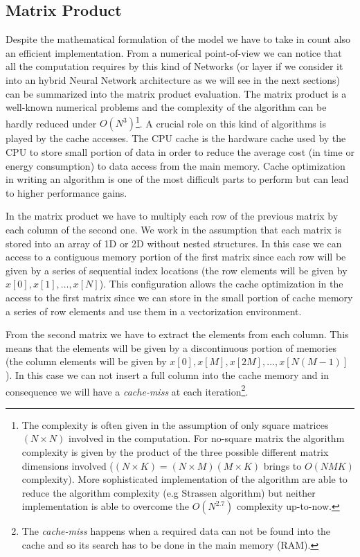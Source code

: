 \documentclass{standalone}
\begin{document}
\subsection[Matrix Product]{Matrix Product}\label{gemm}

Despite the mathematical formulation of the model we have to take in count also an efficient implementation.
From a numerical point-of-view we can notice that all the computation requires by this kind of Networks (or layer if we consider it into an hybrid Neural Network architecture as we will see in the next sections) can be summarized into the matrix product evaluation.
The matrix product is a well-known numerical problems and the complexity of the algorithm can be hardly reduced under $O(N^3)$\footnote{
  The complexity is often given in the assumption of only square matrices $(N\times N)$ involved in the computation.
  For no-square matrix the algorithm complexity is given by the product of the three possible different matrix dimensions involved ($(N\times K) = (N\times M)(M\times K)$ brings to $O(NMK)$ complexity).
  More sophisticated implementation of the algorithm are able to reduce the algorithm complexity (e.g Strassen algorithm) but neither implementation is able to overcome the $O(N^{2.7})$ complexity up-to-now.
}.
A crucial role on this kind of algorithms is played by the cache accesses.
The CPU cache is the hardware cache used by the CPU to store small portion of data in order to reduce the average cost (in time or energy consumption) to data access from the main memory.
Cache optimization in writing an algorithm is one of the most difficult parts to perform but can lead to higher performance gains.

In the matrix product we have to multiply each row of the previous matrix by each column of the second one.
We work in the assumption that each matrix is stored into an array of 1D or 2D without nested structures.
In this case we can access to a contiguous memory portion of the first matrix since each row will be given by a series of sequential index locations (the row elements will be given by $x[0], x[1], \dots, x[N]$).
This configuration allows the cache optimization in the access to the first matrix since we can store in the small portion of cache memory a series of row elements and use them in a vectorization environment.

From the second matrix we have to extract the elements from each column.
This means that the elements will be given by a discontinuous portion of memories (the column elements will be given by $x[0], x[M], x[2M], \dots, x[N(M-1)]$).
In this case we can not insert a full column into the cache memory and in consequence we will have a \emph{cache-miss} at each iteration\footnote{
  The \emph{cache-miss} happens when a required data can not be found into the cache and so its search has to be done in the main memory (RAM).
}.
\end{document}
